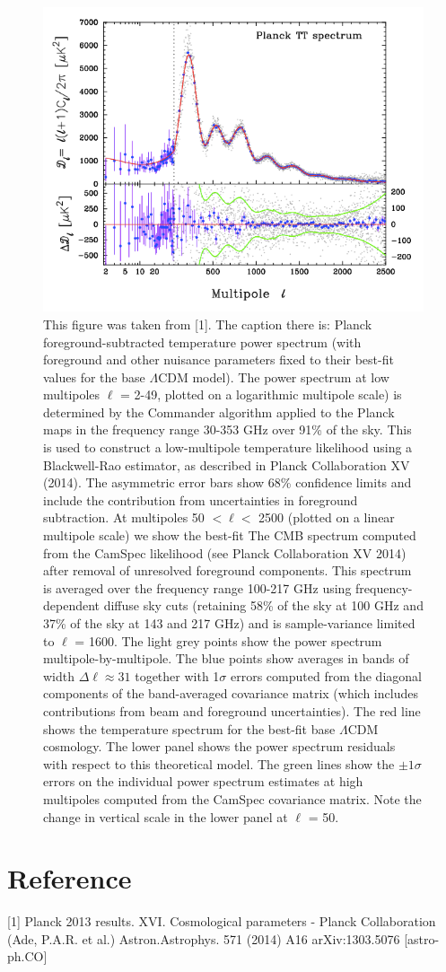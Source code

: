 \documentclass[11pt]{article}
\begin{document}
\begin{figure}[h]
\begin{center}
	\includegraphics[width=\textwidth]{hw_2_data/planck_plot_moreinfo.png}
\caption{\small This figure was taken from [1]. The caption there is:
Planck foreground-subtracted temperature power spectrum (with foreground and other nuisance parameters fixed to their best-fit values for the base $\Lambda$CDM model). The power spectrum at low multipoles $\ell$ = 2-49, plotted on a logarithmic multipole scale) is determined by the Commander algorithm applied to the Planck maps in the frequency range 30-353 GHz over 91\% of the sky. This is used to construct a low-multipole temperature likelihood using a Blackwell-Rao estimator, as described in Planck Collaboration XV (2014). The asymmetric error bars show 68\% confidence limits and include the contribution from uncertainties in foreground subtraction. At multipoles 50 $< \ell <$  2500 (plotted on a linear multipole scale) we show the best-fit The CMB spectrum computed from the CamSpec likelihood (see Planck Collaboration XV 2014) after removal of unresolved foreground components. This spectrum is averaged over the frequency range 100-217 GHz using frequency-dependent diffuse sky cuts (retaining 58\% of the sky at 100 GHz and 37\% of the sky at 143 and 217 GHz) and is sample-variance limited to $\ell$ = 1600. The light grey points show the power spectrum multipole-by-multipole. The blue points show averages in bands of width $\Delta \ell \approx 31$ together with 1$\sigma$ errors  computed from the diagonal components of the band-averaged covariance matrix (which includes contributions from beam and foreground uncertainties). The red line shows the temperature spectrum for the best-fit base $\Lambda$CDM cosmology. The lower panel shows the power spectrum residuals with respect to this theoretical model. The green lines show the $\pm 1\sigma$ errors on the individual power spectrum estimates at high multipoles computed from the CamSpec covariance matrix. Note the change in vertical scale in the lower panel at $\ell$ = 50.}
\label{fig.1}
\end{center}
\end{figure}

\section*{Reference}
[1]  Planck 2013 results. XVI. Cosmological parameters - Planck Collaboration (Ade, P.A.R. et al.) Astron.Astrophys. 571 (2014) A16 arXiv:1303.5076 [astro-ph.CO] 
\end{document}
